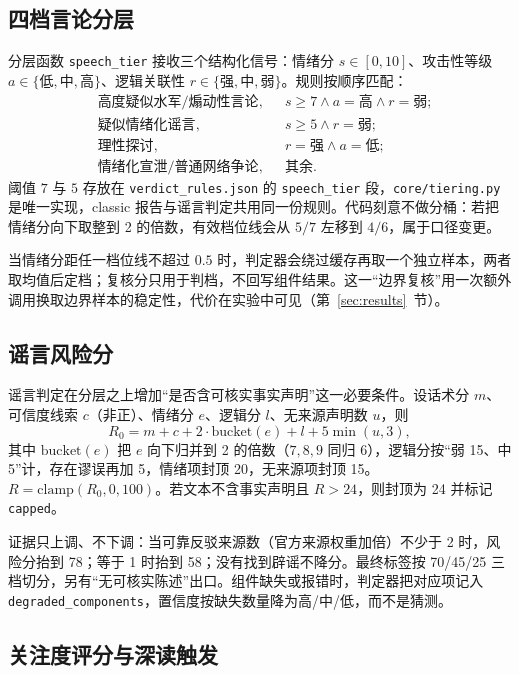 \documentclass[12pt,a4paper,fontset=windows]{ctexart}
\begin{document}
\subsection{四档言论分层}

分层函数 \texttt{speech\_tier} 接收三个结构化信号：情绪分 $s\in[0,10]$、攻击性等级 $a\in\{\text{低},\text{中},\text{高}\}$、逻辑关联性 $r\in\{\text{强},\text{中},\text{弱}\}$。规则按顺序匹配：
\begin{align}
&\text{高度疑似水军/煽动性言论}, && s\ge 7 \land a=\text{高} \land r=\text{弱};\\
&\text{疑似情绪化谣言}, && s\ge 5 \land r=\text{弱};\\
&\text{理性探讨}, && r=\text{强} \land a=\text{低};\\
&\text{情绪化宣泄/普通网络争论}, && \text{其余}.
\end{align}
阈值 $7$ 与 $5$ 存放在 \texttt{verdict\_rules.json} 的 \texttt{speech\_tier} 段，\texttt{core/tiering.py} 是唯一实现，classic 报告与谣言判定共用同一份规则。代码刻意不做分桶：若把情绪分向下取整到 2 的倍数，有效档位线会从 $5/7$ 左移到 $4/6$，属于口径变更。

当情绪分距任一档位线不超过 $0.5$ 时，判定器会绕过缓存再取一个独立样本，两者取均值后定档；复核分只用于判档，不回写组件结果。这一“边界复核”用一次额外调用换取边界样本的稳定性，代价在实验中可见（第~\ref{sec:results}~节）。

\subsection{谣言风险分}

谣言判定在分层之上增加“是否含可核实事实声明”这一必要条件。设话术分 $m$、可信度线索 $c$（非正）、情绪分 $e$、逻辑分 $l$、无来源声明数 $u$，则
\begin{equation}
R_0 = m + c + 2\cdot \mathrm{bucket}(e) + l + 5\min(u,3),
\end{equation}
其中 $\mathrm{bucket}(e)$ 把 $e$ 向下归并到 2 的倍数（$7,8,9$ 同归 6），逻辑分按“弱 15、中 5”计，存在谬误再加 5，情绪项封顶 20，无来源项封顶 15。$R=\mathrm{clamp}(R_0,0,100)$。若文本不含事实声明且 $R>24$，则封顶为 24 并标记 \texttt{capped}。

证据只上调、不下调：当可靠反驳来源数（官方来源权重加倍）不少于 2 时，风险分抬到 78；等于 1 时抬到 58；没有找到辟谣不降分。最终标签按 70/45/25 三档切分，另有“无可核实陈述”出口。组件缺失或报错时，判定器把对应项记入 \texttt{degraded\_components}，置信度按缺失数量降为高/中/低，而不是猜测。

\subsection{关注度评分与深读触发}
\end{document}
